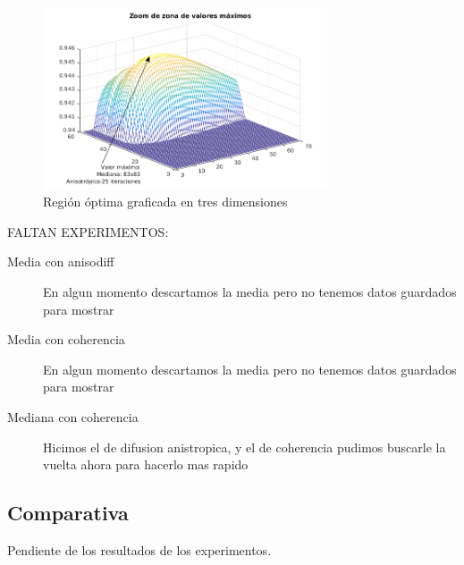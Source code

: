 \begin{figure}[H]
	\centering
  \includegraphics[width=0.75\textwidth]{./Figures/FiguraEvaluacionMaximosAnisodiff.png}
  \caption{Regi\'on \'optima graficada en tres dimensiones}
  \label{fig:centeredregionthermal}
\end{figure}


FALTAN EXPERIMENTOS:
\begin{description}
  \item[Media con anisodiff] En algun momento descartamos la media pero no tenemos datos guardados para mostrar
  \item[Media con coherencia] En algun momento descartamos la media pero no tenemos datos guardados para mostrar
  \item[Mediana con coherencia] Hicimos el de difusion anistropica, y el de coherencia pudimos buscarle la vuelta ahora para hacerlo mas rapido
\end{description}

\subsection{Comparativa}

Pendiente de los resultados de los experimentos.
